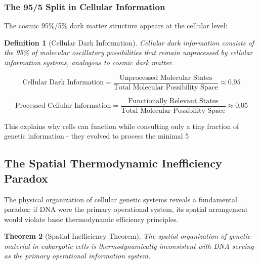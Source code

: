 \documentclass[12pt,a4paper]{article}
\newtheorem{theorem}{Theorem}[section]
\newtheorem{definition}[theorem]{Definition}
\begin{document}
\subsubsection{The 95/5 Split in Cellular Information}

The cosmic 95\%/5\% dark matter structure appears at the cellular level:

\begin{definition}[Cellular Dark Information]
Cellular dark information consists of the 95\% of molecular oscillatory possibilities that remain unprocessed by cellular information systems, analogous to cosmic dark matter.
\end{definition}

$$\text{Cellular Dark Information} = \frac{\text{Unprocessed Molecular States}}{\text{Total Molecular Possibility Space}} \approx 0.95$$

$$\text{Processed Cellular Information} = \frac{\text{Functionally Relevant States}}{\text{Total Molecular Possibility Space}} \approx 0.05$$

This explains why cells can function while consulting only a tiny fraction of genetic information - they evolved to process the minimal 5%

\subsection{The Spatial Thermodynamic Inefficiency Paradox}

The physical organization of cellular genetic systems reveals a fundamental paradox: if DNA were the primary operational system, its spatial arrangement would violate basic thermodynamic efficiency principles.

\begin{theorem}[Spatial Inefficiency Theorem]
The spatial organization of genetic material in eukaryotic cells is thermodynamically inconsistent with DNA serving as the primary operational information system.
\end{theorem}
\end{document}
